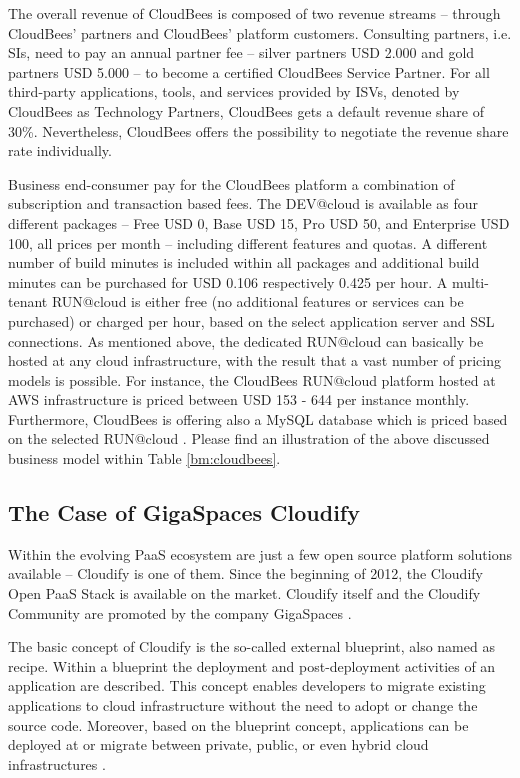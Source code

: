 The overall revenue of CloudBees is composed of two revenue streams -- through CloudBees' partners and CloudBees' platform customers. Consulting partners, i.e. \acp{SI}, need to pay an annual partner fee -- silver partners \ac{USD} 2.000 and gold partners \ac{USD} 5.000 -- to become a certified CloudBees Service Partner. For all third-party applications, tools, and services provided by \acp{ISV}, denoted by CloudBees as Technology Partners, CloudBees gets a default revenue share of 30\%. Nevertheless, CloudBees offers the possibility to negotiate the revenue share rate individually.

Business end-consumer pay for the CloudBees platform a combination of subscription and transaction based fees. The DEV@cloud is available as four different packages -- Free \ac{USD} 0, Base \ac{USD} 15, Pro \ac{USD} 50, and Enterprise \ac{USD} 100, all prices per month -- including different features and quotas. A different number of build minutes is included within all packages and additional build minutes can be purchased for \ac{USD} 0.106 respectively 0.425 per hour. A multi-tenant RUN@cloud is either free (no additional features or services can be purchased) or charged per hour, based on the select application server and SSL connections. As mentioned above, the dedicated RUN@cloud can basically be hosted at any cloud infrastructure, with the result that a vast number of pricing models is possible. For instance, the CloudBees RUN@cloud platform hosted at \ac{AWS} infrastructure is priced between \ac{USD} 153 - 644 per instance monthly. Furthermore, CloudBees is offering also a MySQL database which is priced based on the selected RUN@cloud \citep{CloudBees2013}. Please find an illustration of the above discussed business model within Table \ref{bm:cloudbees}.



\subsection{The Case of GigaSpaces Cloudify}\label{ch:sota:gsc}

Within the evolving \ac{PaaS} ecosystem are just a few open source platform solutions available -- Cloudify is one of them. Since the beginning of 2012, the Cloudify Open \ac{PaaS} Stack is available on the market. Cloudify itself and the Cloudify Community are promoted by the company GigaSpaces \citep{GigaSpaces2013a}.

The basic concept of Cloudify is the so-called external blueprint, also named as recipe. Within a blueprint the deployment and post-deployment activities of an application are described. This concept enables developers to migrate existing applications to cloud infrastructure without the need to adopt or change the source code. Moreover, based on the blueprint concept, applications can be deployed at or migrate between private, public, or even hybrid cloud infrastructures \citep{GigaSpaces2013a}.

